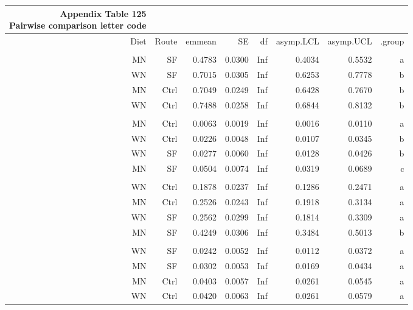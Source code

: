 \documentclass[
  12pt,
  letterpaper,
]{article}
\begin{document}
\begingroup
\fontsize{12.0pt}{14.4pt}\selectfont
\begin{longtable}{rrrrrrrr}
\caption*{
{\large \textbf{Appendix Table 125}} \\ 
{\small \textbf{Pairwise comparison letter code}}
} \\ 
\toprule
{Diet} & {Route} & {emmean} & {SE} & {df} & {asymp.LCL} & {asymp.UCL} & {.group} \\ 
\midrule\addlinespace[2.5pt]
\multicolumn{8}{l}{Lymphocytes} \\[2.5pt] 
\midrule\addlinespace[2.5pt]
MN & SF & 0.4783 & 0.0300 & Inf & 0.4034 & 0.5532 &  a  \\ 
WN & SF & 0.7015 & 0.0305 & Inf & 0.6253 & 0.7778 &   b \\ 
MN & Ctrl & 0.7049 & 0.0249 & Inf & 0.6428 & 0.7670 &   b \\ 
WN & Ctrl & 0.7488 & 0.0258 & Inf & 0.6844 & 0.8132 &   b \\ 
\midrule\addlinespace[2.5pt]
\multicolumn{8}{l}{Monocytes} \\[2.5pt] 
\midrule\addlinespace[2.5pt]
MN & Ctrl & 0.0063 & 0.0019 & Inf & 0.0016 & 0.0110 &  a   \\ 
WN & Ctrl & 0.0226 & 0.0048 & Inf & 0.0107 & 0.0345 &   b  \\ 
WN & SF & 0.0277 & 0.0060 & Inf & 0.0128 & 0.0426 &   b  \\ 
MN & SF & 0.0504 & 0.0074 & Inf & 0.0319 & 0.0689 &    c \\ 
\midrule\addlinespace[2.5pt]
\multicolumn{8}{l}{Neutrophils} \\[2.5pt] 
\midrule\addlinespace[2.5pt]
WN & Ctrl & 0.1878 & 0.0237 & Inf & 0.1286 & 0.2471 &  a  \\ 
MN & Ctrl & 0.2526 & 0.0243 & Inf & 0.1918 & 0.3134 &  a  \\ 
WN & SF & 0.2562 & 0.0299 & Inf & 0.1814 & 0.3309 &  a  \\ 
MN & SF & 0.4249 & 0.0306 & Inf & 0.3484 & 0.5013 &   b \\ 
\midrule\addlinespace[2.5pt]
\multicolumn{8}{l}{Other} \\[2.5pt] 
\midrule\addlinespace[2.5pt]
WN & SF & 0.0242 & 0.0052 & Inf & 0.0112 & 0.0372 &  a \\ 
MN & SF & 0.0302 & 0.0053 & Inf & 0.0169 & 0.0434 &  a \\ 
MN & Ctrl & 0.0403 & 0.0057 & Inf & 0.0261 & 0.0545 &  a \\ 
WN & Ctrl & 0.0420 & 0.0063 & Inf & 0.0261 & 0.0579 &  a \\ 
\bottomrule
\end{longtable}
\endgroup
\end{document}

